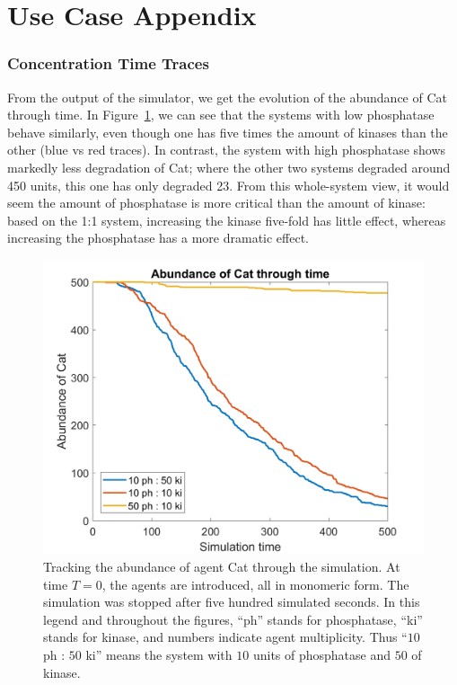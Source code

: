 \section{Use Case Appendix}\label{ap:use-case}

\subsubsection*{Concentration Time Traces}
From the output of the simulator, we get the evolution of the
abundance of Cat through time. In Figure~\ref{F0}, we can see that the
systems with low phosphatase behave similarly, even though one has
five times the amount of kinases than the other (blue vs red
traces). In contrast, the system with high phosphatase shows markedly
less degradation of Cat; where the other two systems degraded around
450 units, this one has only degraded 23. From this whole-system view,
it would seem the amount of phosphatase is more critical than the
amount of kinase: based on the 1:1 system, increasing the kinase
five-fold has little effect, whereas increasing the phosphatase has a
more dramatic effect.

\begin{figure}[h]
  \begin{center}
    \includegraphics[width=0.78\columnwidth]{wnt/F0_abundance_of_cat_through_time}
  \end{center}
  \caption{Tracking the abundance of agent Cat through the
    simulation. At time $T=0$, the agents are introduced, all in
    monomeric form. The simulation was stopped after five hundred
    simulated seconds. In this legend and throughout the figures,
    ``ph'' stands for phosphatase, ``ki'' stands for kinase, and
    numbers indicate agent multiplicity. Thus ``$10$ ph : $50$ ki''
    means the system with $10$ units of phosphatase and $50$ of
    kinase.}
  \label{F0}
\end{figure}


